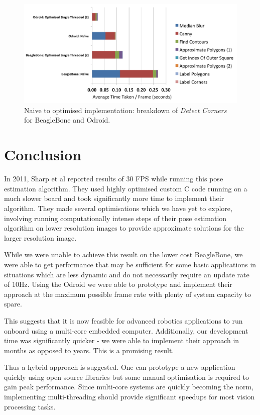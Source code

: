 \documentclass{acm_proc_article-sp}
\begin{document}
\begin{figure}[h]
\centering
\includegraphics[width=\textwidth]{images/performance/worst-to-best-detect-corners.png}
\caption{Naive to optimised implementation: breakdown of \textit{Detect Corners} for BeagleBone and Odroid.}
\label{fig:best-to-worst-detect-corners}
\end{figure}

\section{Conclusion}
In 2011, Sharp et al \cite{sharp_et_al_2001} reported results of 30 FPS while running this pose estimation algorithm.  They used highly optimised custom C code running on a much slower board and took significantly more time to implement their algorithm. They made several optimisations which we have yet to explore, involving running computationally intense steps of their pose estimation algorithm on lower resolution images to provide approximate solutions for the larger resolution image. 

While we were unable to achieve this result on the lower cost BeagleBone, we were able to get performance that may be sufficient for some basic applications in situations which are less dynamic and do not necessarily require an update rate of 10Hz. Using the Odroid we were able to prototype and implement their approach at the maximum possible frame rate with plenty of system capacity to spare. 

This suggests that it is now feasible for advanced robotics applications to run onboard using a multi-core embedded computer. Additionally, our development time was significantly quicker - we were able to implement their approach in months as opposed to years. This is a promising result.

Thus a hybrid approach is suggested. One can prototype a new application quickly using open source libraries but some manual optimisation is required to gain peak performance. Since multi-core systems are quickly becoming the norm, implementing multi-threading should provide significant speedups for most vision processing tasks.

\printbibliography
\end{document}
